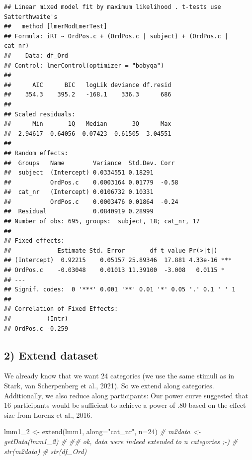 \documentclass[
]{article}
\newenvironment{Shaded}{\begin{snugshade}}{\end{snugshade}}
\newcommand{\AttributeTok}[1]{\textcolor[rgb]{0.77,0.63,0.00}{#1}}
\newcommand{\CommentTok}[1]{\textcolor[rgb]{0.56,0.35,0.01}{\textit{#1}}}
\newcommand{\DecValTok}[1]{\textcolor[rgb]{0.00,0.00,0.81}{#1}}
\newcommand{\FunctionTok}[1]{\textcolor[rgb]{0.00,0.00,0.00}{#1}}
\newcommand{\NormalTok}[1]{#1}
\newcommand{\OtherTok}[1]{\textcolor[rgb]{0.56,0.35,0.01}{#1}}
\newcommand{\StringTok}[1]{\textcolor[rgb]{0.31,0.60,0.02}{#1}}
\begin{document}
\begin{verbatim}
## Linear mixed model fit by maximum likelihood . t-tests use Satterthwaite's
##   method [lmerModLmerTest]
## Formula: iRT ~ OrdPos.c + (OrdPos.c | subject) + (OrdPos.c | cat_nr)
##    Data: df_Ord
## Control: lmerControl(optimizer = "bobyqa")
## 
##      AIC      BIC   logLik deviance df.resid 
##    354.3    395.2   -168.1    336.3      686 
## 
## Scaled residuals: 
##      Min       1Q   Median       3Q      Max 
## -2.94617 -0.64056  0.07423  0.61505  3.04551 
## 
## Random effects:
##  Groups   Name        Variance  Std.Dev. Corr 
##  subject  (Intercept) 0.0334551 0.18291       
##           OrdPos.c    0.0003164 0.01779  -0.58
##  cat_nr   (Intercept) 0.0106732 0.10331       
##           OrdPos.c    0.0003476 0.01864  -0.24
##  Residual             0.0840919 0.28999       
## Number of obs: 695, groups:  subject, 18; cat_nr, 17
## 
## Fixed effects:
##             Estimate Std. Error       df t value Pr(>|t|)    
## (Intercept)  0.92215    0.05157 25.89346  17.881 4.33e-16 ***
## OrdPos.c    -0.03048    0.01013 11.39100  -3.008   0.0115 *  
## ---
## Signif. codes:  0 '***' 0.001 '**' 0.01 '*' 0.05 '.' 0.1 ' ' 1
## 
## Correlation of Fixed Effects:
##          (Intr)
## OrdPos.c -0.259
\end{verbatim}

\hypertarget{extend-dataset}{%
\subsection{2) Extend dataset}\label{extend-dataset}}

We already know that we want 24 categories (we use the same stimuli as
in Stark, van Scherpenberg et al., 2021). So we extend along
categories.\\
Additionally, we also reduce along participants: Our power curve
suggested that 16 participants would be sufficient to achieve a power of
.80 based on the effect size from Lorenz et al., 2016.

\begin{Shaded}
\begin{Highlighting}[]
\NormalTok{lmm1\_2 }\OtherTok{\textless{}{-}} \FunctionTok{extend}\NormalTok{(lmm1, }\AttributeTok{along=}\StringTok{"cat\_nr"}\NormalTok{, }\AttributeTok{n=}\DecValTok{24}\NormalTok{)}
\CommentTok{\# m2data \textless{}{-} getData(lmm1\_2) }
\CommentTok{\# \#\# ok, data were indeed extended to n categories ;{-})}
\CommentTok{\# str(m2data)}
\CommentTok{\# str(df\_Ord)}
\end{Highlighting}
\end{Shaded}
\end{document}
